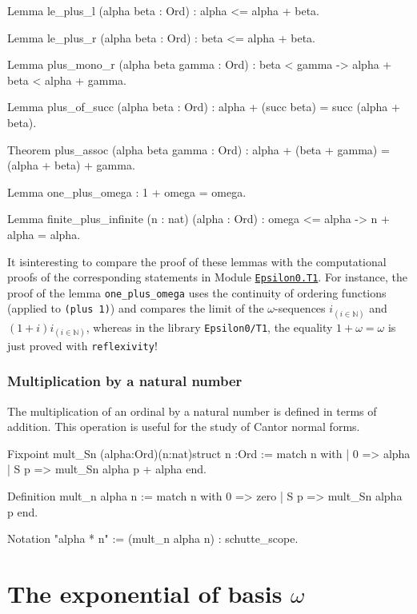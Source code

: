 \documentclass[a4paper]{book}
\begin{document}
{\begin{Coqsrc}
Lemma le_plus_l (alpha beta : Ord) : alpha <= alpha + beta.

Lemma le_plus_r (alpha beta : Ord) :  beta <= alpha + beta.

Lemma plus_mono_r (alpha beta gamma : Ord) : 
    beta < gamma -> alpha + beta < alpha + gamma.

Lemma plus_of_succ (alpha beta : Ord) :
    alpha + (succ beta) = succ (alpha + beta).

Theorem plus_assoc (alpha beta gamma : Ord) :
  alpha + (beta + gamma) = (alpha + beta) + gamma.

Lemma one_plus_omega :  1 + omega = omega.

Lemma finite_plus_infinite (n : nat) (alpha : Ord) :
  omega <= alpha -> n + alpha = alpha.
\end{Coqsrc} 


It isinteresting to compare the proof of these lemmas with the 
computational proofs of the corresponding statements in Module
\href{../src/html/hydras.Epsilon0.T1.html}%
{\texttt{Epsilon0.T1}}. 
For instance, the proof of the lemma 
\texttt{one\_plus\_omega} uses the continuity of ordering functions (applied to  \texttt{(plus 1)}) and compares the limit of the $\omega$-sequences $i_{(i \in \mathbb{N})}$ and
$(1+i)i_{(i \in \mathbb{N})}$, whereas in the library  \texttt{Epsilon0/T1}, the equality 
$1+\omega=\omega$ is just proved with \texttt{reflexivity}!



\subsubsection{Multiplication by a natural number}

The multiplication of an ordinal by a natural number is defined in terms of addition.
This operation is useful for the study of Cantor normal forms.

\begin{Coqsrc}
Fixpoint mult_Sn (alpha:Ord)(n:nat){struct n} :Ord :=
 match n with 
            | 0 => alpha
            | S p => mult_Sn alpha p + alpha
 end.

Definition mult_n alpha n :=
  match n with
      0 => zero
    | S p => mult_Sn alpha p
  end.

Notation "alpha * n" := (mult_n alpha n) : schutte_scope.
\end{Coqsrc}

\section{The exponential of basis \texorpdfstring{$\omega$}{omega}}

}
\end{document}
